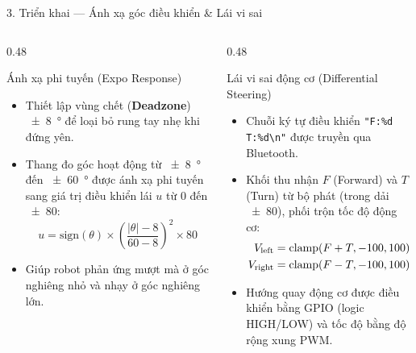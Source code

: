 \documentclass[aspectratio=169, 10pt]{beamer}
\begin{document}
\begin{frame}{3. Triển khai — Ánh xạ góc điều khiển \& Lái vi sai}
  \begin{columns}[T]
    \begin{column}{0.48\textwidth}
      \begin{block}{Ánh xạ phi tuyến (Expo Response)}
        \small
        \begin{itemize}
          \item Thiết lập vùng chết (\textbf{Deadzone}) \qty{\pm 8}{\degree} để loại bỏ rung tay nhẹ khi đứng yên.
          \item Thang đo góc hoạt động từ \qty{\pm 8}{\degree} đến \qty{\pm 60}{\degree} được ánh xạ phi tuyến sang giá trị điều khiển lái $u$ từ \num{0} đến \num{\pm 80}:
          $$u = \mathrm{sign}(\theta) \times \left( \frac{|\theta| - \num{8}}{\num{60} - \num{8}} \right)^2 \times \num{80}$$
          \item Giúp robot phản ứng mượt mà ở góc nghiêng nhỏ và nhạy ở góc nghiêng lớn.
        \end{itemize}
      \end{block}
    \end{column}
    \begin{column}{0.48\textwidth}
      \begin{block}{Lái vi sai động cơ (Differential Steering)}
        \small
        \begin{itemize}
          \item Chuỗi ký tự điều khiển \texttt{"F:\%d T:\%d\textbackslash n"} được truyền qua Bluetooth.
          \item Khối thu nhận $F$ (Forward) và $T$ (Turn) từ bộ phát (trong dải \num{\pm 80}), phối trộn tốc độ động cơ:
          \begin{align}
            V_{\text{left}} = \text{clamp}(F + T, \num{-100}, \num{100}) \notag \\
            V_{\text{right}} = \text{clamp}(F - T, \num{-100}, \num{100}) \notag
          \end{align}
          \item Hướng quay động cơ được điều khiển bằng GPIO (logic HIGH/LOW) và tốc độ bằng độ rộng xung PWM.
        \end{itemize}
      \end{block}
    \end{column}
  \end{columns}
\end{frame}
\end{document}
